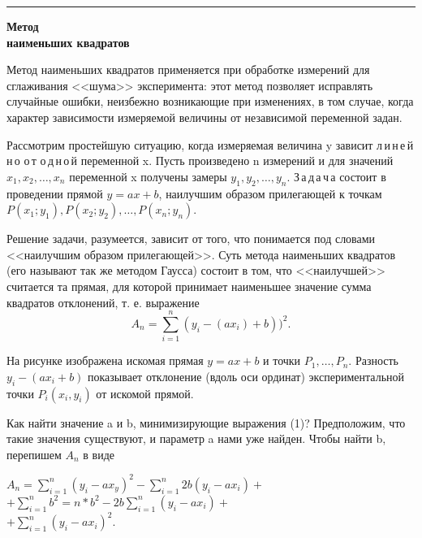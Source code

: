 
    \begin{center}
        \rule{20cm}{0.4pt} %
    \end{center}
    \begin{multicols}{2}
        \begin{flushleft}
        \huge\textbf{{Метод\\ наименьших квадратов}}
        \end{flushleft}
        
        Метод наименьших квадратов применяется при обработке измерений для сглаживания <<шума>> эксперимента: этот метод позволяет исправлять случайные ошибки, неизбежно возникающие при изменениях, в том случае, когда характер зависимости измеряемой величины от независимой переменной задан.
        
        Рассмотрим простейшую ситуацию, когда измеряемая величина y зависит л\,и\,н\,е\,й\,н\,о о\,т о\,д\,н\,о\,й переменной x. Пусть произведено n измерений и для значений $x_1, x_2, \ldots, x_n$ переменной x получены замеры $y_1,y_2,\ldots ,y_n$. З\,а\,д\,а\,ч\,а состоит в проведении прямой $y=ax+b$, наилучшим образом прилегающей к точкам $P(x_1;y_1), P(x_2;y_2), \ldots,P(x_n;y_n)$. %
        
        Решение задачи, разумеется, зависит от того, что понимается под словами <<наилучшим образом прилегающей>>. Суть метода наименьших квадратов (его называют так же методом Гаусса) состоит в том, что <<наилучшей>> считается та прямая, для которой принимает наименьшее значение сумма квадратов отклонений, т. е. выражение
        \begin{equation}
         A_n = \sum\limits_{i=1}^n(y_i - (ax_i)+b))^2 .
        \end{equation}

        
        На рисунке изображена искомая прямая $y = ax+b$ и точки $P_1, \ldots, P_n$. Разность 
        $y_i - (ax_i +b)$ показывает отклонение (вдоль оси ординат) экспериментальной точки $P_i(x_i,y_i)$ от искомой прямой.
        
        Как найти значение a и b, минимизирующие выражения (1)? Предположим, что такие значения существуют, и параметр a нами уже найден. Чтобы найти b, перепишем $A_n$ в виде
        \begin{flushright}
         $A_n = \sum\limits_{i=1}^n (y_i -ax_y)^2 - \sum\limits_{i=1}^n 2b(y_i - ax_i) +$\\
        $+\sum\limits_{i=1}^n b^2 = n*b^2 -2b \sum\limits_{i=1}^n (y_i - ax_i) +$\\
	    $+\sum\limits_{i=1}^n (y_i - ax_i)^2.$
	    \end{flushright}
	    

\end{multicols}
